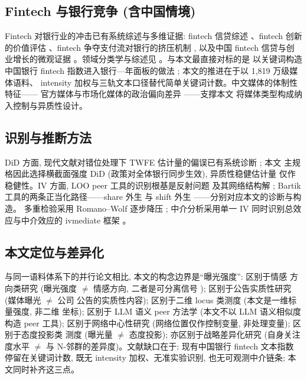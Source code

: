 \subsection{Fintech 与银行竞争 (含中国情境)}
Fintech 对银行业的冲击已有系统综述与多维证据: fintech 信贷综述
\parencite{berg2022fintechlending}、fintech 创新的价值评估
\parencite{chen2019fintechvalue}、fintech 争夺支付流对银行的挤压机制
\parencite{parlour2022payment}, 以及中国 fintech 信贷与创业增长的微观证据
\parencite{hau2024fintechcredit}。领域分类学与综述见
\parencite{gomber2018fintech,goldstein2019fintech}。与本文最直接对标的是
以关键词构造中国银行 fintech 指数进入银行—年面板的做法
\parencite{cheng2020bankfintech}; 本文的推进在于以 1{,}819 万级媒体语料、
intensity 加权与三轨文本口径替代简单关键词计数。中文媒体的体制性特征——
官方媒体与市场化媒体的政治偏向差异 \parencite{qin2018mediabias}——支撑本文
将媒体类型构成纳入控制与异质性设计。

\subsection{识别与推断方法}
DiD 方面, 现代文献对错位处理下 TWFE 估计量的偏误已有系统诊断
\parencite{baker2022staggered,callaway2021difference,sun2021estimating}; 本文
主规格因此选择横截面强度 DiD (政策对全体银行同步生效), 异质性稳健估计量
仅作稳健性。IV 方面, LOO peer 工具的识别根基是反射问题
\parencite{manski1993reflection} 及其网络结构解 \parencite{bramoulle2009peer};
Bartik 工具的两条正当化路径——share 外生 \parencite{goldsmith2020bartik} 与
shift 外生 \parencite{borusyak2022shiftshare}——分别对应本文的诊断与构造。
多重检验采用 Romano--Wolf 逐步降压 \parencite{romanowolf2005snooping};
中介分析采用单一 IV 同时识别总效应与中介效应的 ivmediate 框架
\parencite{dippel2020ivmediate}。

\subsection{本文定位与差异化}
与同一语料体系下的并行论文相比, 本文的构念边界是``曝光强度'': 区别于情感
方向类研究 (曝光强度 $\neq$ 情感方向, 二者是可分离信号
\parencite{cookson2024social}); 区别于公告实质性研究 (媒体曝光 $\neq$ 公司
公告的实质性内容); 区别于二维 locus 类测度 (本文是一维标量强度, 非二维
坐标); 区别于 LLM 语义 peer 方法学 (本文不以 LLM 语义相似度构造 peer 工具);
区别于网络中心性研究 (网络位置仅作控制变量, 非处理变量); 区别于态度投影类
测度 (曝光量 $\neq$ 态度投影); 亦区别于战略差异化研究 (自身关注度水平
$\neq$ 与 N-邻群的差异度)。文献缺口在于: 现有中国银行 fintech 文本指数
停留在关键词计数, 既无 intensity 加权、无准实验识别, 也无可观测中介链条;
本文同时补齐这三点。

